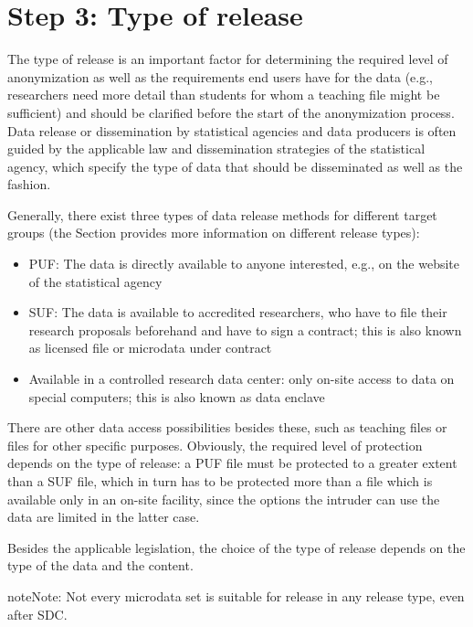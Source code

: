 \documentclass[letterpaper,10pt,english]{sphinxmanual}
\begin{document}
\section{Step 3: Type of release}
\label{\detokenize{process:step-3-type-of-release}}
The type of release is an important factor for determining the required
level of anonymization as well as the requirements end users have for
the data (e.g., researchers need more detail than students for whom a
teaching file might be sufficient) and should be clarified before the
start of the anonymization process. Data release or dissemination by
statistical agencies and data producers is often guided by the
applicable law and dissemination strategies of the statistical agency,
which specify the type of data that should be disseminated as well as
the fashion.

Generally, there exist three types of data release methods for different
target groups (the Section
provides more information on different release
types):
\begin{itemize}
\item {} 
PUF: The data is directly available to anyone interested, e.g., on
the website of the statistical agency

\item {} 
SUF: The data is available to accredited researchers, who have to
file their research proposals beforehand and have to sign a contract;
this is also known as licensed file or microdata under contract

\item {} 
Available in a controlled research data center: only on-site access
to data on special computers; this is also known as data enclave

\end{itemize}

There are other data access possibilities besides these, such as
teaching files or files for other specific purposes. Obviously, the
required level of protection depends on the type of release: a PUF file
must be protected to a greater extent than a SUF file, which in turn has
to be protected more than a file which is available only in an on-site
facility, since the options the intruder can use the data are limited in
the latter case.

Besides the applicable legislation, the choice of the type of release
depends on the type of the data and the content.

\begin{sphinxadmonition}{note}{Note:}
Not every microdata set is suitable for release in any release type, even after SDC.
\end{sphinxadmonition}
\end{document}
